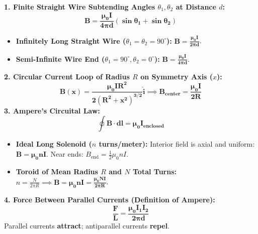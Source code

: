 \documentclass[10pt,a4paper]{article}
\begin{document}
\begin{formulabox}
\textbf{1. Finite Straight Wire Subtending Angles $\theta_1, \theta_2$ at Distance $d$:}
\begin{equation}
  \mathbf{B = \frac{\mu_0 I}{4\pi d}(\sin\theta_1 + \sin\theta_2)}
\end{equation}
\begin{itemize}
  \item \textbf{Infinitely Long Straight Wire ($\theta_1 = \theta_2 = 90^\circ$):} $\mathbf{B = \frac{\mu_0 I}{2\pi d}}$.
  \item \textbf{Semi-Infinite Wire End ($\theta_1 = 90^\circ, \theta_2 = 0^\circ$):} $\mathbf{B = \frac{\mu_0 I}{4\pi d}}$.
\end{itemize}
\textbf{2. Circular Current Loop of Radius $R$ on Symmetry Axis ($x$):}
\begin{equation}
  \mathbf{B(x) = \frac{\mu_0 I R^2}{2(R^2 + x^2)^{3/2}} \hat{\mathbf{i}}} \implies \mathbf{B_{\text{center}} = \frac{\mu_0 I}{2R}}
\end{equation}
\textbf{3. Ampere's Circuital Law:}
\begin{equation}
  \mathbf{\oint \mathbf{B}\cdot d\mathbf{l} = \mu_0 I_{\text{enclosed}}}
\end{equation}
\begin{itemize}
  \item \textbf{Ideal Long Solenoid ($n$ turns/meter):} Interior field is axial and uniform: $\mathbf{B = \mu_0 n I}$. Near ends: $B_{\text{end}} = \frac{1}{2}\mu_0 n I$.
  \item \textbf{Toroid of Mean Radius $R$ and $N$ Total Turns:} $n = \frac{N}{2\pi R} \implies \mathbf{B = \mu_0 n I = \frac{\mu_0 N I}{2\pi R}}$.
\end{itemize}
\textbf{4. Force Between Parallel Currents (Definition of Ampere):}
\begin{equation}
  \mathbf{\frac{F}{L} = \frac{\mu_0 I_1 I_2}{2\pi d}}
\end{equation}
Parallel currents \textbf{attract}; antiparallel currents \textbf{repel}.
\end{formulabox}
\end{document}
